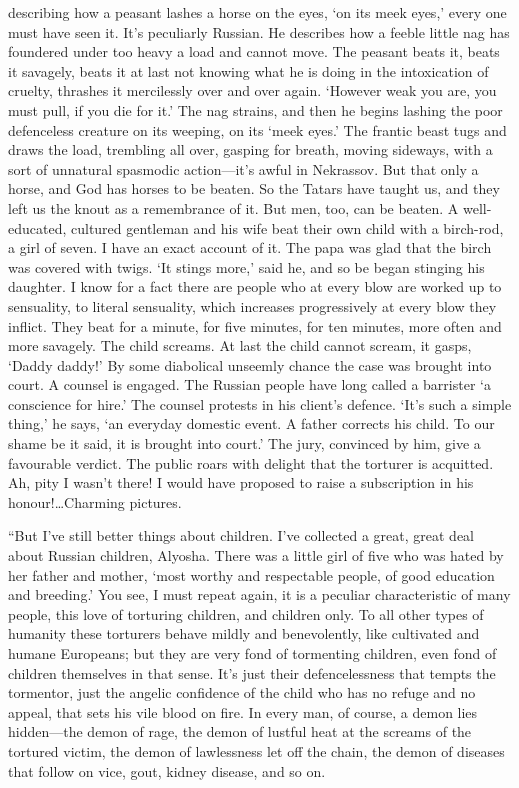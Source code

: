 describing how a peasant lashes a horse on the eyes, `on its meek
eyes,' every one must have seen it. It's peculiarly Russian. He
describes how a feeble little nag has foundered under too heavy a load
and cannot move. The peasant beats it, beats it savagely, beats it at
last not knowing what he is doing in the intoxication of cruelty,
thrashes it mercilessly over and over again. `However weak you are,
you must pull, if you die for it.' The nag strains, and then he begins
lashing the poor defenceless creature on its weeping, on its `meek
eyes.' The frantic beast tugs and draws the load, trembling all over,
gasping for breath, moving sideways, with a sort of unnatural
spasmodic ac\-tion---it's awful in Nekrassov. But that only a horse,
and God has horses to be beaten. So the Tatars have taught us, and
they left us the knout as a remembrance of it. But men, too, can be
beaten. A well-educated, cultured gentleman and his wife beat their
own child with a birch-rod, a girl of seven. I have an exact account
of it. The papa was glad that the birch was covered with twigs. `It
stings more,' said he, and so be began stinging his daughter. I know
for a fact there are people who at every blow are worked up to
sensuality, to literal sensuality, which increases progressively at
every blow they inflict. They beat for a minute, for five minutes, for
ten minutes, more often and more savagely. The child screams. At last
the child cannot scream, it gasps, `Daddy daddy!' By some diabolical
unseemly chance the case was brought into court. A counsel is engaged.
The Russian people have long called a barrister `a conscience for
hire.' The counsel protests in his client's defence. `It's such
 a simple thing,' he says, `an everyday domestic event. A
father corrects his child. To our shame be it said, it is brought into
court.' The jury, convinced by him, give a favourable verdict. The
public roars with delight that the torturer is acquitted. Ah, pity I
wasn't there! I would have proposed to raise a subscription in his
honour!\ldots Charming pictures.

``But I've still better things about children. I've collected a great,
great deal about Russian children, Alyosha. There was a little girl of
five who was hated by her father and mother, `most worthy and
respectable people, of good education and breeding.' You see, I must
repeat again, it is a peculiar characteristic of many people, this
love of torturing children, and children only. To all other types of
humanity these torturers behave mildly and benevolently, like
cultivated and humane Europeans; but they are very fond of tormenting
children, even fond of children themselves in that sense. It's just
their defencelessness that tempts the tormentor, just the angelic
confidence of the child who has no refuge and no appeal, that sets his
vile blood on fire. In every man, of course, a demon lies
hid\-den---the demon of rage, the demon of lustful heat at the screams
of the tortured victim, the demon of lawlessness let off the chain,
the demon of diseases that follow on vice, gout, kidney disease, and
so on.

